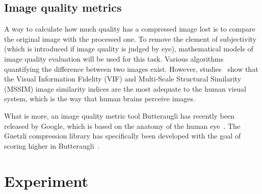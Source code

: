 \documentclass[12pt]{article}
\begin{document}
\subsection{Image quality metrics} \label{imagequalitymetrics}
A way to calculate how much quality has a compressed image lost is to compare the original image with the processed one. To remove the element of subjectivity (which is introduced if image quality is judged by eye), mathematical models of image quality evaluation will be used for this task. Various algorithms quantifying the difference between two images exist. However, studies~\cite{qualityMetricEval1,qualityMetricEval2} show that the Visual Information Fidelity (VIF) and Multi-Scale Structural Similarity (MSSIM) image similarity indices are the most adequate to the human visual system, which is the way that human brains perceive images.

What is more, an image quality metric tool Butteraugli has recently been released by Google, which is based on the anatomy of the human eye~\cite{highPerformanceImages}. The Guetzli compression library has specifically been developed with the goal of scoring higher in Butteraugli~\cite{guetzli2}.
\clearpage
\section{Experiment}
\end{document}
